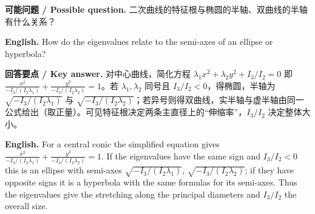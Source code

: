 \documentclass[UTF8,11pt,a4paper]{ctexart}
\newcommand{\EN}[1]{\par\noindent \textbf{English.} #1\par}
\newcommand{\ASK}[4]{\par\noindent \textbf{可能问题 / Possible question.} #1\par\EN{#2}\noindent \textbf{回答要点 / Key answer.} #3\par\EN{#4}\medskip}
\theoremstyle{definition}
\begin{document}
\ASK{二次曲线的特征根与椭圆的半轴、双曲线的半轴有什么关系？}{How do the eigenvalues relate to the semi-axes of an ellipse or hyperbola?}{对中心曲线，简化方程 $\lambda_1x^2+\lambda_2y^2+I_3/I_2=0$ 即 $\frac{x^2}{-I_3/(I_2\lambda_1)}+\frac{y^2}{-I_3/(I_2\lambda_2)}=1$。若 $\lambda_1,\lambda_2$ 同号且 $I_3/I_2<0$，得椭圆，半轴为 $\sqrt{-I_3/(I_2\lambda_1)}$ 与 $\sqrt{-I_3/(I_2\lambda_2)}$；若异号则得双曲线，实半轴与虚半轴由同一公式给出（取正量）。可见特征根决定两条主直径上的``伸缩率''，$I_3/I_2$ 决定整体大小。}{For a central conic the simplified equation gives $\frac{x^2}{-I_3/(I_2\lambda_1)}+\frac{y^2}{-I_3/(I_2\lambda_2)}=1$. If the eigenvalues have the same sign and $I_3/I_2<0$ this is an ellipse with semi-axes $\sqrt{-I_3/(I_2\lambda_1)}$, $\sqrt{-I_3/(I_2\lambda_2)}$; if they have opposite signs it is a hyperbola with the same formulas for its semi-axes. Thus the eigenvalues give the stretching along the principal diameters and $I_3/I_2$ the overall size.}
\end{document}
